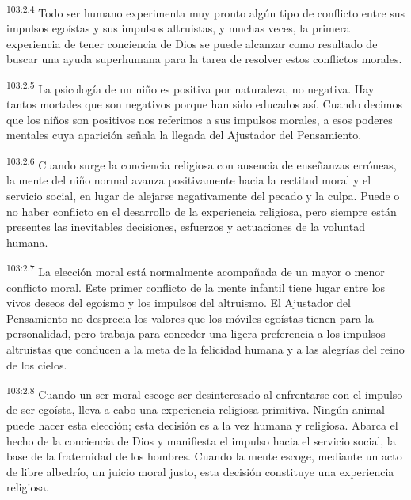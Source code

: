 \documentclass[twoside, 11pt]{book}
\begin{document}
\par
\textsuperscript{103:2.4} Todo ser humano experimenta muy pronto algún tipo de conflicto entre sus impulsos egoístas y sus impulsos altruistas, y muchas veces, la primera experiencia de tener conciencia de Dios se puede alcanzar como resultado de buscar una ayuda superhumana para la tarea de resolver estos conflictos morales.

\par
\textsuperscript{103:2.5} La psicología de un niño es positiva por naturaleza, no negativa. Hay tantos mortales que son negativos porque han sido educados así. Cuando decimos que los niños son positivos nos referimos a sus impulsos morales, a esos poderes mentales cuya aparición señala la llegada del Ajustador del Pensamiento.

\par
\textsuperscript{103:2.6} Cuando surge la conciencia religiosa con ausencia de enseñanzas erróneas, la mente del niño normal avanza positivamente hacia la rectitud moral y el servicio social, en lugar de alejarse negativamente del pecado y la culpa. Puede o no haber conflicto en el desarrollo de la experiencia religiosa, pero siempre están presentes las inevitables decisiones, esfuerzos y actuaciones de la voluntad humana.

\par
\textsuperscript{103:2.7} La elección moral está normalmente acompañada de un mayor o menor conflicto moral. Este primer conflicto de la mente infantil tiene lugar entre los vivos deseos del egoísmo y los impulsos del altruismo. El Ajustador del Pensamiento no desprecia los valores que los móviles egoístas tienen para la personalidad, pero trabaja para conceder una ligera preferencia a los impulsos altruistas que conducen a la meta de la felicidad humana y a las alegrías del reino de los cielos.

\par
\textsuperscript{103:2.8} Cuando un ser moral escoge ser desinteresado al enfrentarse con el impulso de ser egoísta, lleva a cabo una experiencia religiosa primitiva. Ningún animal puede hacer esta elección; esta decisión es a la vez humana y religiosa. Abarca el hecho de la conciencia de Dios y manifiesta el impulso hacia el servicio social, la base de la fraternidad de los hombres. Cuando la mente escoge, mediante un acto de libre albedrío, un juicio moral justo, esta decisión constituye una experiencia religiosa.
\end{document}

